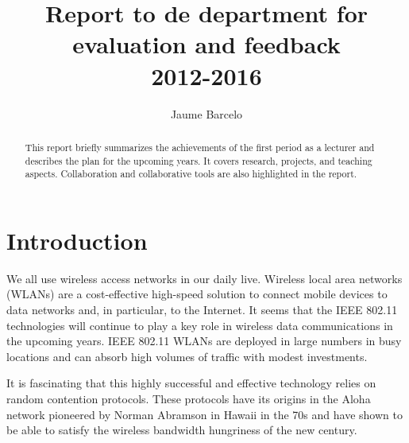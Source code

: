 \documentclass[a4paper,twocolumns]{article}%
\begin{document}
\title{Report to de department for evaluation and feedback \\ 2012-2016 }

\author{Jaume Barcelo}


\date{}

\maketitle

\begin{abstract}
This report briefly summarizes the achievements of the first period as a lecturer and describes the plan for the upcoming years.
It covers research, projects, and teaching aspects.
Collaboration and collaborative tools are also highlighted in the report.



\end{abstract}

\tableofcontents

\clearpage


\section{Introduction}

We all use wireless access networks in our daily live.
Wireless local area networks (WLANs) are a cost-effective high-speed solution to connect mobile devices to data networks and, in particular, to the Internet.
It seems that the IEEE 802.11 technologies will continue to play a key role in wireless data communications in the upcoming years.
IEEE 802.11 WLANs are deployed in large numbers in busy locations and can absorb high volumes of traffic with modest investments.

It is fascinating that this highly successful and effective technology relies on random contention protocols.
These protocols have its origins in the Aloha network pioneered by Norman Abramson in Hawaii in the 70s and have shown to be able to satisfy the wireless bandwidth hungriness of the new century.
\end{document}
